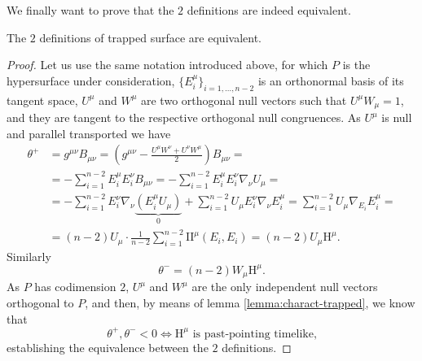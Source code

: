 We finally want to prove that the \(2\) definitions are indeed equivalent.
\begin{lemma}
	\label{lemma:equiv-trapped}
	The \(2\) definitions of trapped surface are equivalent.
\end{lemma}
\begin{proof}
	Let us use the same notation introduced above, for which \(P\) is the hypersurface under consideration, \(\{E_i^{\mu}\}_{i = 1, \ldots, n - 2}\) is an orthonormal basis of its tangent space, \(U^{\mu}\) and \(W^{\mu}\) are two orthogonal null vectors such that \(U^{\mu}W_{\mu} = 1\), and they are tangent to the respective orthogonal null congruences. As \(U^{\mu}\) is null and parallel transported we have
	\begin{align*}
		\theta^+ &= g^{\mu\nu}B_{\mu\nu} = \left(g^{\mu\nu} - \frac{U^{\mu}W^{\nu} + U^{\nu}W^{\mu}}{2}\right)B_{\mu\nu} =\\
		&= - \sum_{i=1}^{n - 2}E_i^{\mu}E_i^{\nu}B_{\mu\nu} = - \sum_{i=1}^{n - 2}E_i^{\mu}E_i^{\nu}\nabla_{\nu}U_{\mu} = \\
		& = -  \sum_{i=1}^{n - 2}E_i^{\nu}\nabla_{\nu}\underbrace{\left(E_i^{\mu}U_{\mu}\right)}_{0} +  \sum_{i=1}^{n - 2}U_{\mu}E_i^{\nu}\nabla_{\nu}E_i^{\mu} = \sum_{i=1}^{n - 2}U_{\mu}\nabla_{E_i}E_i^{\mu} = \\
		& = (n - 2) U_{\mu} \cdot \frac{1}{n - 2}\sum_{i=1}^{n - 2}\mathrm{I\!I}^{\mu} \left(E_i, E_i\right) = (n - 2) U_{\mu}\mathrm{H}^{\mu}.
	\end{align*}
	Similarly
	\[
	\theta^- = (n - 2) W_{\mu}\mathrm{H}^{\mu}.
	\]
	As \(P\) has codimension \(2\), \(U^{\mu}\) and \(W^{\mu}\) are the only independent null vectors orthogonal to \(P\), and then, by means of lemma \ref{lemma:charact-trapped}, we know that 
	\[
	\theta^+ , \theta^- < 0 \iff \mathrm{H}^{\mu} \text{ is past-pointing timelike,}
	\]
	establishing the equivalence between the \(2\) definitions.
\end{proof}

